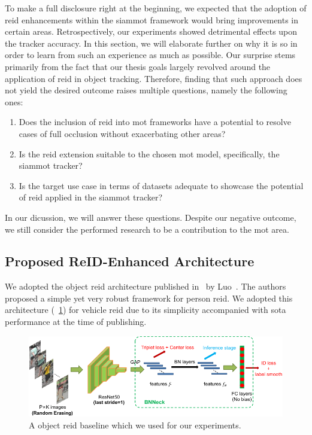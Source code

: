 To make a full disclosure right at the beginning, we expected that the adoption of \gls{reid} enhancements within the \gls{siammot} framework would bring improvements in certain areas. Retrospectively, our experiments showed detrimental effects upon the tracker accuracy. In this section, we will elaborate further on why it is so in order to learn from such an experience as much as possible. Our surprise stems primarily from the fact that our thesis goals largely revolved around the application of \gls{reid} in object tracking. Therefore, finding that such approach does not yield the desired outcome raises multiple questions, namely the following ones:
\begin{enumerate}
    \item Does the inclusion of \gls{reid} into \gls{mot} frameworks have a potential to resolve cases of full occlusion without exacerbating other areas?
    \item Is the \gls{reid} extension suitable to the chosen \gls{mot} model, specifically, the \gls{siammot} tracker?
    \item Is the target use case in terms of datasets adequate to showcase the potential of \gls{reid} applied in the \gls{siammot} tracker?
\end{enumerate}
In our dicussion, we will answer these questions. Despite our negative outcome, we still consider the performed research to be a contribution to the \gls{mot} area.

\subsection{Proposed ReID-Enhanced Architecture}
\label{ssec:ProposedReIDEnhancedArchitecture}

We adopted the object \gls{reid} architecture published in~\cite{luo2019bagoftricksreid} by Luo~\etal{}. The authors proposed a simple yet very robust framework for person \gls{reid}. We adopted this architecture (\figtext{}~\ref{fig:BagOfTricksReIDArchitecture}) for vehicle \gls{reid} due to its simplicity accompanied with \gls{sota} performance at the time of publishing.

\begin{figure}[!t]
    \centering
    \includegraphics[width=\linewidth]{figures/siamese_tracking/bagoftricks_reid_architecture.pdf}
    \caption[Gls{reid} baseline]{A object \gls{reid} baseline which we used for our experiments. }
    \label{fig:BagOfTricksReIDArchitecture}
\end{figure}

